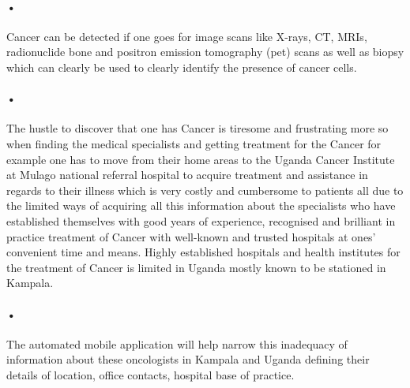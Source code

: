 \documentclass[12pt]{article}
\begin{document}
\paragraph{•}Cancer can be detected if one goes for image scans like X-rays, CT, MRIs, radionuclide bone and positron emission tomography (pet) scans as well as biopsy which can clearly be used to clearly identify the presence of cancer cells.

\paragraph{•}The hustle to discover that one has Cancer is tiresome and frustrating more so when finding the medical specialists and getting treatment for the Cancer for example one has to move from their home areas to the Uganda Cancer Institute at Mulago national referral hospital to acquire treatment and assistance in regards to their illness which is very costly and cumbersome to patients all due to the limited ways of acquiring all this information about the specialists who have established themselves with good years of experience, recognised and brilliant in practice treatment of Cancer with well-known and trusted hospitals at ones’ convenient time and means. Highly established hospitals and health institutes for the treatment of Cancer is limited in Uganda mostly known to be stationed in Kampala.

\paragraph{•}The automated mobile application will help narrow this inadequacy of information about these oncologists in Kampala and Uganda defining their details of location, office contacts, hospital base of practice.
\end{document}
